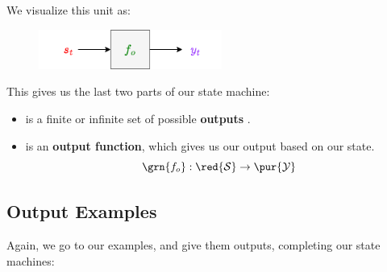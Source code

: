         We visualize this unit as:
        
        \begin{figure}[H]
            \centering
            \includegraphics[width=60mm,scale=0.4]{images/rnn_images/output_diagram.png}
        \end{figure}

        This gives us the last two parts of our state machine:
            
        \begin{itemize}
            \item {} is a finite or infinite set of possible \textbf{outputs} .
            
            \item {} is an \textbf{output function}, which gives us our output based on our state.
                \begin{equation}
                    \grn{f_o}: \red{\mathcal{S}} \rightarrow \pur{\mathcal{Y}}
                \end{equation}
        \end{itemize}



    \phantom{}
    
    \subsection{Output Examples}
        
        Again, we go to our examples, and give them outputs, completing our state machines:
        

